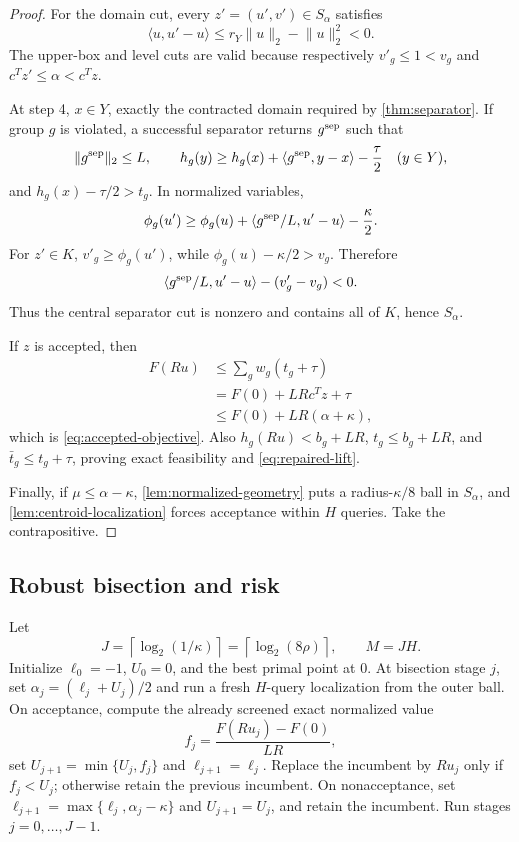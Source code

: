 \documentclass[11pt]{article}
\numberwithin{equation}{section}
\theoremstyle{remark}
\theoremstyle{definition}
\newcommand{\ip}[2]{\langle #1,#2\rangle}
\newcommand{\norm}[1]{\lVert #1\rVert_2}
\begin{document}
\begin{proof}
For the domain cut, every $z'=(u',v')\in S_\alpha$ satisfies
\[
\ip u{u'-u}\le r_Y\norm u-\norm u^2<0.
\]
The upper-box and level cuts are valid because respectively $v'_g\le1<v_g$ and $c^Tz'\le\alpha<c^Tz$.

At step 4, $x\in Y$, exactly the contracted domain required by \cref{thm:separator}.  If group $g$ is violated, a successful separator returns $g^{\rm sep}$ such that
\[
\norm{g^{\rm sep}}\le L,
\qquad
h_g(y)\ge h_g(x)+\ip{g^{\rm sep}}{y-x}-\frac\tau2
\quad(y\in Y),
\]
and $h_g(x)-\tau/2>t_g$.  In normalized variables,
\[
\phi_g(u')\ge\phi_g(u)+\ip{g^{\rm sep}/L}{u'-u}-\frac\kappa2.
\]
For $z'\in K$, $v'_g\ge\phi_g(u')$, while $\phi_g(u)-\kappa/2>v_g$.  Therefore
\[
\ip{g^{\rm sep}/L}{u'-u}-(v'_g-v_g)<0.
\]
Thus the central separator cut is nonzero and contains all of $K$, hence $S_\alpha$.

If $z$ is accepted, then
\begin{align*}
F(Ru)
&\le\sum_gw_g(t_g+\tau)\\
&=F(0)+LRc^Tz+\tau\\
&\le F(0)+LR(\alpha+\kappa),
\end{align*}
which is \eqref{eq:accepted-objective}.  Also $h_g(Ru)<b_g+LR$, $t_g\le b_g+LR$, and $\bar t_g\le t_g+\tau$, proving exact feasibility and \eqref{eq:repaired-lift}.

Finally, if $\mu\le\alpha-\kappa$, \cref{lem:normalized-geometry} puts a radius-$\kappa/8$ ball in $S_\alpha$, and \cref{lem:centroid-localization} forces acceptance within $H$ queries.  Take the contrapositive.
\end{proof}

\subsection{Robust bisection and risk}

Let
\[
J=\left\lceil\log_2(1/\kappa)\right\rceil
=\left\lceil\log_2(8\rho)\right\rceil,
\qquad
M=JH.
\]
Initialize $\ell_0=-1$, $U_0=0$, and the best primal point at $0$.  At bisection stage $j$, set $\alpha_j=(\ell_j+U_j)/2$ and run a fresh $H$-query localization from the outer ball.  On acceptance, compute the already screened exact normalized value
\[
f_j=\frac{F(Ru_j)-F(0)}{LR},
\]
set $U_{j+1}=\min\{U_j,f_j\}$ and $\ell_{j+1}=\ell_j$.
Replace the incumbent by $Ru_j$ only if $f_j<U_j$; otherwise retain
the previous incumbent. On nonacceptance, set
$\ell_{j+1}=\max\{\ell_j,\alpha_j-\kappa\}$ and $U_{j+1}=U_j$,
and retain the incumbent. Run stages $j=0,\ldots,J-1$.
\end{document}
